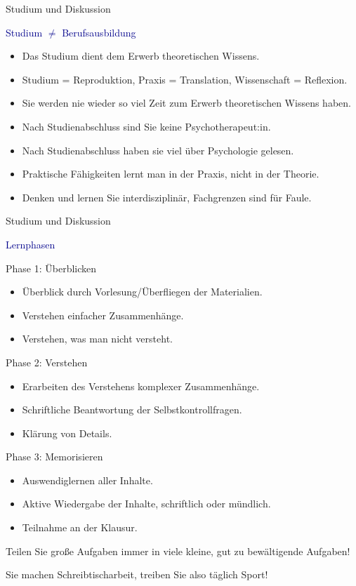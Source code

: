 \documentclass[
  8pt,
  ignorenonframetext,
]{beamer}
\providecommand{\tightlist}{%
  \setlength{\itemsep}{0pt}\setlength{\parskip}{0pt}}
\begin{document}
\begin{frame}{Studium und Diskussion}
\protect\hypertarget{studium-und-diskussion-2}{}
\large

\textcolor{darkblue}{Studium $\neq$ Berufsausbildung} \normalsize

\begin{itemize}
\tightlist
\item
  Das Studium dient dem Erwerb theoretischen Wissens.
\item
  Studium = Reproduktion, Praxis = Translation, Wissenschaft =
  Reflexion.
\item
  Sie werden nie wieder so viel Zeit zum Erwerb theoretischen Wissens
  haben.
\item
  Nach Studienabschluss sind Sie keine Psychotherapeut:in.
\item
  Nach Studienabschluss haben sie viel über Psychologie gelesen.
\item
  Praktische Fähigkeiten lernt man in der Praxis, nicht in der Theorie.
\item
  Denken und lernen Sie interdisziplinär, Fachgrenzen sind für Faule.
\end{itemize}
\end{frame}

\begin{frame}{Studium und Diskussion}
\protect\hypertarget{studium-und-diskussion-3}{}
\large
{}

\textcolor{darkblue}{Lernphasen} \small

Phase 1: Überblicken

\begin{itemize}
\tightlist
\item
  Überblick durch Vorlesung/Überfliegen der Materialien.
\item
  Verstehen einfacher Zusammenhänge.
\item
  Verstehen, was man nicht versteht.
\end{itemize}

Phase 2: Verstehen

\begin{itemize}
\tightlist
\item
  Erarbeiten des Verstehens komplexer Zusammenhänge.
\item
  Schriftliche Beantwortung der Selbstkontrollfragen.
\item
  Klärung von Details.
\end{itemize}

Phase 3: Memorisieren

\begin{itemize}
\tightlist
\item
  Auswendiglernen aller Inhalte.
\item
  Aktive Wiedergabe der Inhalte, schriftlich oder mündlich.
\item
  Teilnahme an der Klausur.
\end{itemize}

Teilen Sie große Aufgaben immer in viele kleine, gut zu bewältigende
Aufgaben!

Sie machen Schreibtischarbeit, treiben Sie also täglich Sport!
\end{frame}
\end{document}
